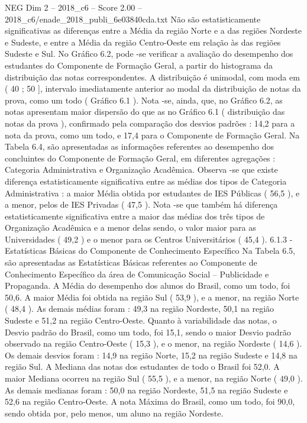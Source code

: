 \begin{textsample}{NEG Dim 2 – 2018\_c6 – Score 2.00 – 2018\_c6/enade\_2018\_publi\_6e03840cda.txt}
Não são estatisticamente significativas as diferenças entre a Média da região Norte e a das regiões Nordeste e Sudeste, e entre a Média da região Centro-Oeste em relação às das regiões Sudeste e Sul.
No Gráfico 6.2, pode -se verificar a avaliação do desempenho dos estudantes do Componente de Formação Geral, a partir do histograma da distribuição das notas correspondentes.
A distribuição é unimodal, com moda em ( 40 ; 50 ], intervalo imediatamente anterior ao modal da distribuição de notas da prova, como um todo ( Gráfico 6.1 ).
Nota -se, ainda, que, no Gráfico 6.2, as notas apresentam maior dispersão do que as no Gráfico 6.1 ( distribuição das notas da prova ), confirmado pela comparação dos desvios padrões : 14,2 para a nota da prova, como um todo, e 17,4 para o Componente de Formação Geral.
Na Tabela 6.4, são apresentadas as informações referentes ao desempenho dos concluintes do Componente de Formação Geral, em diferentes agregações : Categoria Administrativa e Organização Acadêmica.
Observa -se que existe diferença estatisticamente significativa entre as médias dos tipos de Categoria Administrativa : a maior Média obtida por estudantes de IES Públicas ( 56,5 ), e a menor, pelos de IES Privadas ( 47,5 ).
Nota -se que também há diferença estatisticamente significativa entre a maior das médias dos três tipos de Organização Acadêmica e a menor delas sendo, o valor maior para as Universidades ( 49,2 ) e o menor para os Centros Universitários ( 45,4 ). 6.1.3 - Estatísticas Básicas do Componente de Conhecimento Específico Na Tabela 6.5, são apresentadas as Estatísticas Básicas referentes ao Componente de Conhecimento Específico da área de Comunicação Social – Publicidade e Propaganda.
A Média do desempenho dos alunos do Brasil, como um todo, foi 50,6.
A maior Média foi obtida na região Sul ( 53,9 ), e a menor, na região Norte ( 48,4 ).
As demais médias foram : 49,3 na região Nordeste, 50,1 na região Sudeste e 51,2 na região Centro-Oeste.
Quanto à variabilidade das notas, o Desvio padrão do Brasil, como um todo, foi 15,1, sendo o maior Desvio padrão observado na região Centro-Oeste ( 15,3 ), e o menor, na região Nordeste ( 14,6 ).
Os demais desvios foram : 14,9 na região Norte, 15,2 na região Sudeste e 14,8 na região Sul.
A Mediana das notas dos estudantes de todo o Brasil foi 52,0.
A maior Mediana ocorreu na região Sul ( 55,5 ), e a menor, na região Norte ( 49,0 ).
As demais medianas foram : 50,0 na região Nordeste, 51,5 na região Sudeste e 52,6 na região Centro-Oeste.
A nota Máxima do Brasil, como um todo, foi 90,0, sendo obtida por, pelo menos, um aluno na região Nordeste.

\end{textsample}
